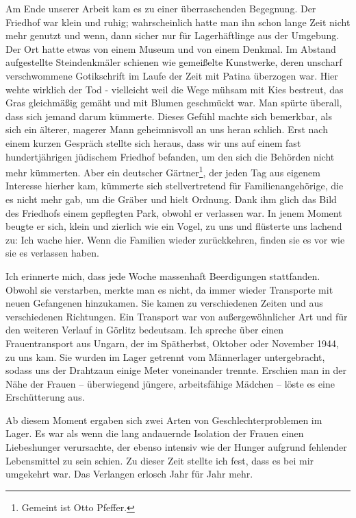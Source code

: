 Am Ende unserer Arbeit kam es zu einer überraschenden Begegnung. Der Friedhof war klein und ruhig; wahrscheinlich hatte man ihn schon lange Zeit nicht mehr genutzt und wenn, dann sicher nur für Lagerhäftlinge aus der Umgebung. Der Ort hatte etwas von einem Museum und von einem Denkmal. Im Abstand aufgestellte Steindenkmäler schienen wie gemeißelte Kunstwerke, deren unscharf verschwommene Gotikschrift im Laufe der Zeit mit Patina überzogen war. Hier wehte wirklich der Tod - vielleicht weil die Wege mühsam mit Kies bestreut, das Gras gleichmäßig gemäht und mit Blumen geschmückt war. Man spürte überall, dass sich jemand darum kümmerte. Dieses Gefühl machte sich bemerkbar, als sich ein älterer, magerer Mann geheimnisvoll an uns heran schlich. Erst nach einem kurzen Gespräch stellte sich heraus, dass wir uns auf einem fast hundertjährigen jüdischem Friedhof befanden, um den sich die Behörden nicht mehr kümmerten. Aber ein deutscher Gärtner\footnote{Gemeint ist Otto Pfeffer.}, der jeden Tag aus eigenem Interesse hierher kam, kümmerte sich stellvertretend für Familienangehörige, die es nicht mehr gab, um die Gräber und hielt Ordnung. Dank ihm glich das Bild des Friedhofs einem gepflegten Park, obwohl er verlassen war. In jenem Moment beugte er sich, klein und zierlich wie ein Vogel, zu uns und flüsterte uns lachend zu:  \glqq Ich wache hier. Wenn die Familien wieder zurückkehren, finden sie es vor wie sie es verlassen haben.\grqq

Ich erinnerte mich, dass jede Woche massenhaft Beerdigungen stattfanden. Obwohl sie verstarben, merkte man es nicht, da immer wieder Transporte mit neuen Gefangenen hinzukamen. Sie kamen zu verschiedenen Zeiten und aus verschiedenen Richtungen. Ein Transport war von außergewöhnlicher Art und für den weiteren Verlauf in Görlitz bedeutsam. Ich spreche über einen Frauentransport aus Ungarn, der im Spätherbst, Oktober oder November 1944, zu uns kam. Sie wurden im Lager getrennt vom Männerlager untergebracht,  sodass uns der Drahtzaun einige Meter voneinander trennte. Erschien man in der Nähe der Frauen -- überwiegend jüngere, arbeitsfähige Mädchen -- löste es eine Erschütterung aus.

Ab diesem Moment ergaben sich zwei Arten von Geschlechterproblemen im Lager.
Es war als wenn die lang andauernde Isolation der Frauen einen Liebeshunger verursachte, der ebenso intensiv wie der Hunger aufgrund fehlender Lebensmittel zu sein schien. Zu dieser Zeit stellte ich fest, dass es bei mir umgekehrt war. Das Verlangen erlosch Jahr für Jahr mehr.

